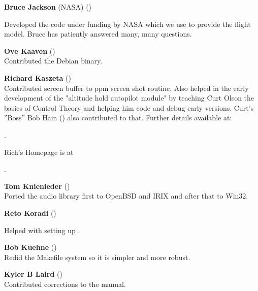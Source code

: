 \noindent \textbf{Bruce Jackson} (NASA)
()
 \medskip

  \medskip

 \noindent
   Developed the  code under funding by NASA which we use to provide the
   flight model. Bruce has patiently answered many, many questions.
 \medskip


\noindent \textbf{Ove Kaaven}  ()\\
 Contributed the Debian binary.
 \medskip

\noindent \textbf{Richard Kaszeta}  ()\\
  Contributed screen buffer to ppm screen shot routine.
  Also helped in the early development of the "altitude
  hold autopilot module" by teaching Curt Olson the basics of Control Theory
  and helping him code and debug early versions. Curt's ''Boss'' Bob Hain
 () also contributed to that.  Further details available at:
 \medskip

  .
  \medskip

\noindent
  Rich's Homepage is at
  \medskip

  .
  \medskip

\noindent \textbf{Tom Knienieder} ()\\
  Ported the audio library first to OpenBSD and IRIX and after that to Win32.
 \medskip

\noindent \textbf{Reto Koradi} ()
 \medskip

\href{http://www.mol.biol.ethz.ch/~kor}{}
 \medskip

\noindent
  Helped with setting up .
 \medskip

\noindent \textbf{Bob Kuehne} ()\\
  Redid the Makefile system so it is simpler and more robust.
 \medskip

\noindent \textbf{Kyler B Laird} ()\\
 Contributed corrections to the manual.
 \medskip

